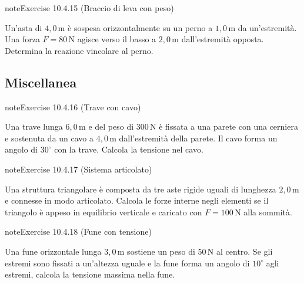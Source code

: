 \documentclass[letterpaper,10pt,italian]{jupyterBook}
\begin{document}
\begin{sphinxadmonition}{note}{Exercise 10.4.15 (Braccio di leva con peso)}



\sphinxAtStartPar
Un’asta di \(4,0 \, \text{m}\) è sospesa orizzontalmente su un perno a \(1,0 \, \text{m}\) da un’estremità. Una forza \(F = 80 \, \text{N}\) agisce verso il basso a \(2,0 \, \text{m}\) dall’estremità opposta. Determina la reazione vincolare al perno.
\end{sphinxadmonition}


\subsection{Miscellanea}
\label{\detokenize{ch/mechanics/statics-problems:miscellanea}} \label{exercise:ch/mechanics/statics-problems-exercise-15}

\begin{sphinxadmonition}{note}{Exercise 10.4.16 (Trave con cavo)}



\sphinxAtStartPar
Una trave lunga \(6,0 \, \text{m}\) e del peso di \(300 \, \text{N}\) è fissata a una parete con una cerniera e sostenuta da un cavo a \(4,0 \, \text{m}\) dall’estremità della parete. Il cavo forma un angolo di \(30^\circ\) con la trave. Calcola la tensione nel cavo.
\end{sphinxadmonition}
 \label{exercise:ch/mechanics/statics-problems-exercise-16}

\begin{sphinxadmonition}{note}{Exercise 10.4.17 (Sistema articolato)}



\sphinxAtStartPar
Una struttura triangolare è composta da tre aste rigide uguali di lunghezza \(2,0 \, \text{m}\) e connesse in modo articolato. Calcola le forze interne negli elementi se il triangolo è appeso in equilibrio verticale e caricato con \(F = 100 \, \text{N}\) alla sommità.
\end{sphinxadmonition}
 \label{exercise:ch/mechanics/statics-problems-exercise-17}

\begin{sphinxadmonition}{note}{Exercise 10.4.18 (Fune con tensione)}



\sphinxAtStartPar
Una fune orizzontale lunga \(3,0 \, \text{m}\) sostiene un peso di \(50 \, \text{N}\) al centro. Se gli estremi sono fissati a un’altezza uguale e la fune forma un angolo di \(10^\circ\) agli estremi, calcola la tensione massima nella fune.
\end{sphinxadmonition}
 \label{exercise:ch/mechanics/statics-problems-exercise-18}
\end{document}
